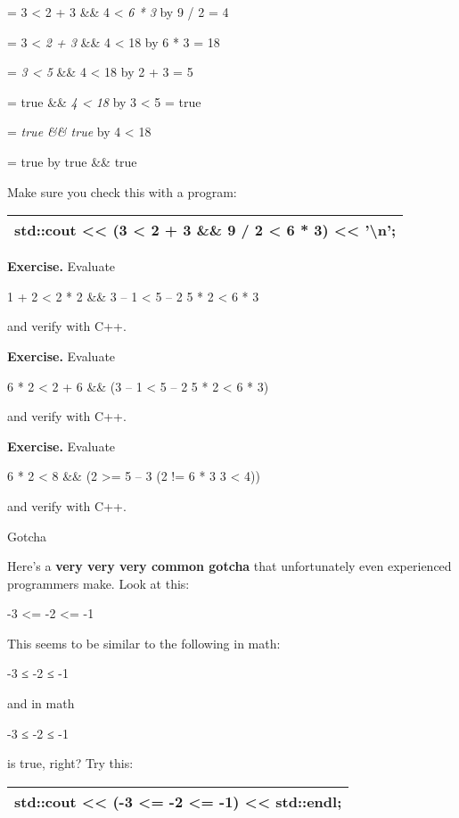 \documentclass[
]{article}
\begin{document}
= 3 \textless{} 2 + 3 \&\& 4 \textless{} \emph{6 * 3} by 9 / 2 = 4

= 3 \textless{} \emph{2 + 3} \&\& 4 \textless{} 18 by 6 * 3 = 18

= \emph{3 \textless{} 5} \&\& 4 \textless{} 18 by 2 + 3 = 5

= true \&\& \emph{4 \textless{} 18} by 3 \textless{} 5 = true

= \emph{true \&\& true} by 4 \textless{} 18

= true by true \&\& true

Make sure you check this with a program:

\begin{longtable}[]{@{}l@{}}
\toprule
\endhead
std::cout \textless\textless{} (3 \textless{} 2 + 3 \&\& 9 / 2
\textless{} 6 * 3) \textless\textless{}
'\textbackslash n';\tabularnewline
\bottomrule
\end{longtable}

\textbf{Exercise.} Evaluate

1 + 2 \textless{} 2 * 2 \&\& 3 -- 1 \textless{} 5 -- 2
\textbar\textbar{} 5 * 2 \textless{} 6 * 3

and verify with C++.

\textbf{Exercise.} Evaluate

6 * 2 \textless{} 2 + 6 \&\& (3 -- 1 \textless{} 5 -- 2
\textbar\textbar{} 5 * 2 \textless{} 6 * 3)

and verify with C++.

\textbf{Exercise.} Evaluate

6 * 2 \textless{} 8 \&\& (2 \textgreater= 5 -- 3 \textbar\textbar{} (2
!= 6 * 3 \textbar\textbar{} 3 \textless{} 4))

and verify with C++.

Gotcha

Here's a \textbf{very very very common gotcha} that unfortunately even
experienced programmers make. Look at this:

-3 \textless= -2 \textless= -1

This seems to be similar to the following in math:

-3 ≤ -2 ≤ -1

and in math

-3 ≤ -2 ≤ -1

is true, right? Try this:

\begin{longtable}[]{@{}l@{}}
\toprule
\endhead
std::cout \textless\textless{} (-3 \textless= -2 \textless= -1)
\textless\textless{} std::endl;\tabularnewline
\bottomrule
\end{longtable}
\end{document}
